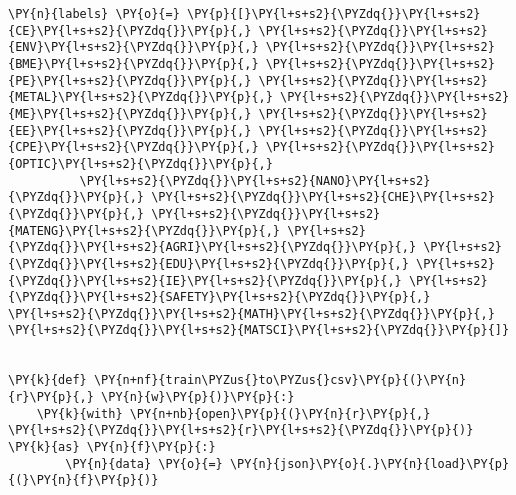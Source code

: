 \documentclass[../main.tex]{subfiles}
\begin{document}
    \begin{tcolorbox}[breakable, size=fbox, boxrule=1pt, pad at break*=1mm,colback=cellbackground, colframe=cellborder]
\begin{Verbatim}[commandchars=\\\{\}]
\PY{n}{labels} \PY{o}{=} \PY{p}{[}\PY{l+s+s2}{\PYZdq{}}\PY{l+s+s2}{CE}\PY{l+s+s2}{\PYZdq{}}\PY{p}{,} \PY{l+s+s2}{\PYZdq{}}\PY{l+s+s2}{ENV}\PY{l+s+s2}{\PYZdq{}}\PY{p}{,} \PY{l+s+s2}{\PYZdq{}}\PY{l+s+s2}{BME}\PY{l+s+s2}{\PYZdq{}}\PY{p}{,} \PY{l+s+s2}{\PYZdq{}}\PY{l+s+s2}{PE}\PY{l+s+s2}{\PYZdq{}}\PY{p}{,} \PY{l+s+s2}{\PYZdq{}}\PY{l+s+s2}{METAL}\PY{l+s+s2}{\PYZdq{}}\PY{p}{,} \PY{l+s+s2}{\PYZdq{}}\PY{l+s+s2}{ME}\PY{l+s+s2}{\PYZdq{}}\PY{p}{,} \PY{l+s+s2}{\PYZdq{}}\PY{l+s+s2}{EE}\PY{l+s+s2}{\PYZdq{}}\PY{p}{,} \PY{l+s+s2}{\PYZdq{}}\PY{l+s+s2}{CPE}\PY{l+s+s2}{\PYZdq{}}\PY{p}{,} \PY{l+s+s2}{\PYZdq{}}\PY{l+s+s2}{OPTIC}\PY{l+s+s2}{\PYZdq{}}\PY{p}{,}
          \PY{l+s+s2}{\PYZdq{}}\PY{l+s+s2}{NANO}\PY{l+s+s2}{\PYZdq{}}\PY{p}{,} \PY{l+s+s2}{\PYZdq{}}\PY{l+s+s2}{CHE}\PY{l+s+s2}{\PYZdq{}}\PY{p}{,} \PY{l+s+s2}{\PYZdq{}}\PY{l+s+s2}{MATENG}\PY{l+s+s2}{\PYZdq{}}\PY{p}{,} \PY{l+s+s2}{\PYZdq{}}\PY{l+s+s2}{AGRI}\PY{l+s+s2}{\PYZdq{}}\PY{p}{,} \PY{l+s+s2}{\PYZdq{}}\PY{l+s+s2}{EDU}\PY{l+s+s2}{\PYZdq{}}\PY{p}{,} \PY{l+s+s2}{\PYZdq{}}\PY{l+s+s2}{IE}\PY{l+s+s2}{\PYZdq{}}\PY{p}{,} \PY{l+s+s2}{\PYZdq{}}\PY{l+s+s2}{SAFETY}\PY{l+s+s2}{\PYZdq{}}\PY{p}{,} \PY{l+s+s2}{\PYZdq{}}\PY{l+s+s2}{MATH}\PY{l+s+s2}{\PYZdq{}}\PY{p}{,} \PY{l+s+s2}{\PYZdq{}}\PY{l+s+s2}{MATSCI}\PY{l+s+s2}{\PYZdq{}}\PY{p}{]}


\PY{k}{def} \PY{n+nf}{train\PYZus{}to\PYZus{}csv}\PY{p}{(}\PY{n}{r}\PY{p}{,} \PY{n}{w}\PY{p}{)}\PY{p}{:}
    \PY{k}{with} \PY{n+nb}{open}\PY{p}{(}\PY{n}{r}\PY{p}{,} \PY{l+s+s2}{\PYZdq{}}\PY{l+s+s2}{r}\PY{l+s+s2}{\PYZdq{}}\PY{p}{)} \PY{k}{as} \PY{n}{f}\PY{p}{:}
        \PY{n}{data} \PY{o}{=} \PY{n}{json}\PY{o}{.}\PY{n}{load}\PY{p}{(}\PY{n}{f}\PY{p}{)}


\end{Verbatim}
\end{tcolorbox}
\end{document}
